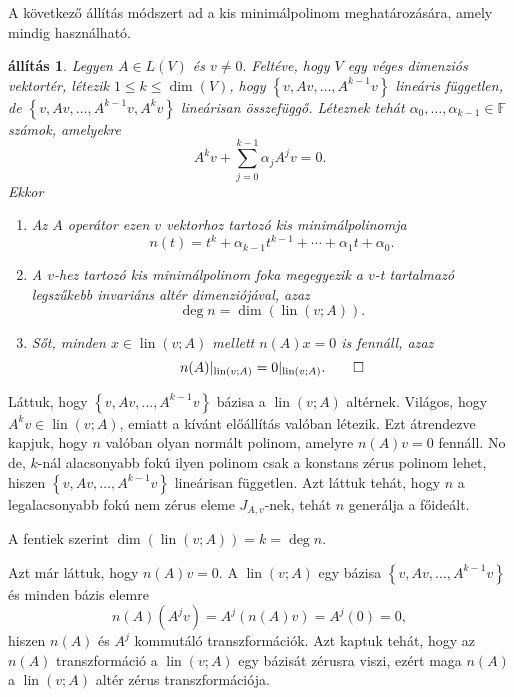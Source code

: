 \documentclass[a4paper, showtrims]{memoir}
\makeatletter
\renewenvironment{proof}[1][\proofname]
    {\par\pushQED{\qed}%
    \normalfont \topsep6\p@\@plus6\p@\relax
    \trivlist
    \item[\hskip\labelsep
        \itshape
    #1\@addpunct{:}]\ignorespaces}
    {\popQED\endtrivlist\@endpefalse}
\theoremstyle{plain}
\newtheorem{proposition}{állítás}[chapter]
\theoremstyle{remark}
\theoremstyle{definition}
\DeclareMathOperator{\lin}{lin}
\makeatother
\begin{document}
A következő állítás módszert ad a kis minimálpolinom meghatározására,
amely mindig használható.
\begin{proposition}
	Legyen $A\in L\left( V \right)$ és $v\neq 0.$
	Feltéve, hogy $V$ egy véges dimenziós vektortér,
	létezik $1\leq k \leq \dim(V)$,
	hogy
	$\left\{ v,Av,\ldots,A^{k-1}v \right\}$ lineáris független,
	de $\left\{ v,Av,\ldots,A^{k-1}v,A^{k}v \right\}$ lineárisan összefüggő.
	Léteznek tehát $\alpha_0,\ldots,\alpha_{k-1}\in\mathbb{F}$
	számok, amelyekre
	\[
		A^{k}v+\sum_{j=0}^{k-1}\alpha_jA^{j}v=0.
	\]
    Ekkor
    \begin{enumerate}
        \item 
	    Az $A$ operátor ezen $v$ vektorhoz tartozó kis minimálpolinomja
    	\[
	    	n\left( t \right)=
            t^k+\alpha_{k-1}t^{k-1}+\cdots+\alpha_1t+\alpha_0.
    	\]
        \item
        A $v$-hez tartozó kis minimálpolinom foka megegyezik a $v$-t tartalmazó legszűkebb invariáns altér dimenziójával, azaz 
        \[
            \deg n=\dim\left( \lin\left( v;A \right) \right).
        \]
        \item
        Sőt, minden $x\in\lin\left( v;A \right)$ mellett $n\left( A \right)x=0$ is fennáll, azaz
        \[
            n(A)|_{\lin\left( v;A \right)}=0|_{\lin\left( v;A \right)}.\qedhere
        \]
    \end{enumerate}
\end{proposition}
\begin{proof}
	Láttuk, hogy $\left\{ v,Av,\ldots,A^{k-1}v \right\}$ bázisa a $\lin\left( v;A \right)$ altérnek.
	Világos, hogy $A^kv\in\lin\left( v;A \right)$, emiatt a kívánt előállítás valóban létezik.
	Ezt átrendezve kapjuk, hogy $n$ valóban olyan normált polinom, amelyre $n\left( A \right)v=0$ fennáll.
	No de, $k$-nál alacsonyabb fokú ilyen polinom csak a konstans zérus polinom lehet,
	hiszen $\left\{ v,Av,\ldots,A^{k-1}v \right\}$ lineárisan független.
	Azt láttuk tehát, hogy $n$ a legalacsonyabb fokú nem zérus eleme $J_{A,v}$-nek,
	tehát $n$ generálja a főideált.

    A fentiek szerint $\dim\left( \lin\left( v;A \right) \right)=k=\deg n$.

    Azt már láttuk, hogy $n\left( A \right)v=0$. 
    A $\lin\left( v;A \right)$ egy bázisa $\left\{ v,Av,\ldots,A^{k-1}v \right\}$ és minden bázis elemre
    \[
        n\left( A \right)\left( A^jv \right)=A^j\left( n\left( A \right)v \right)=A^j\left( 0 \right)=0,
    \]
    hiszen $n\left( A \right)$ és $A^j$ kommutáló transzformációk.
    Azt kaptuk tehát, hogy az $n\left( A \right)$ transzformáció a $\lin\left( v;A \right)$ egy bázisát zérusra viszi,
    ezért maga $n\left( A \right)$ a $\lin\left( v;A \right)$ altér zérus transzformációja.
\end{proof}
\end{document}

